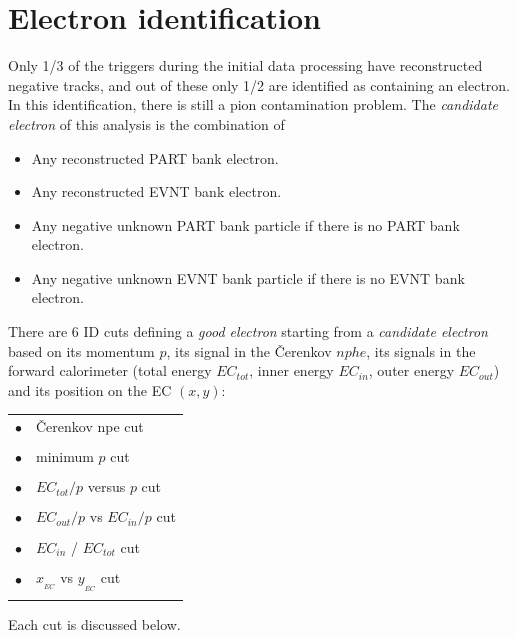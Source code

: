 
\section{Electron identification} 

Only 1/3 of the triggers during the initial data processing have reconstructed
negative tracks, and out of these only 1/2 are identified as containing an electron.
In this identification, there is still a pion contamination problem. 
The {\it candidate electron} of this analysis is the combination of 
\begin{itemize}
 \item Any reconstructed PART bank electron.
 \item Any reconstructed EVNT bank electron.
 \item Any negative unknown PART bank particle if there is no PART bank electron.
 \item Any negative unknown EVNT bank particle if there is no EVNT bank electron. 
\end{itemize}
\clearpage\newpage
There are 6 ID cuts defining a {\it good electron}
starting from a {\it candidate electron} based on its momentum $p$, its signal in the 
\v Cerenkov $nphe$, its signals in the forward calorimeter (total energy $EC_{tot}$, 
inner energy $EC_{in}$, outer energy $EC_{out}$) and its position on the EC $(x,y)$:
\begin{table}[h]
\begin{center}
  \begin{tabular}{l l}
$\bullet$  &  \v Cerenkov npe cut \\ &  \\
$\bullet$  & minimum $p$ cut \\&  \\
$\bullet$  & $EC_{tot} / p$ versus $p$ cut \\&  \\
$\bullet$  & $EC_{out}/p$ vs $EC_{in}/p$ cut \\&  \\
$\bullet$  & $EC_{in}$ / $EC_{tot}$ cut \\&  \\
$\bullet$  & $x_{_{EC}}$ vs $y_{_{EC}}$ cut \\&  \\
\end{tabular}
 \end{center}
\end{table}

Each cut is discussed below.

